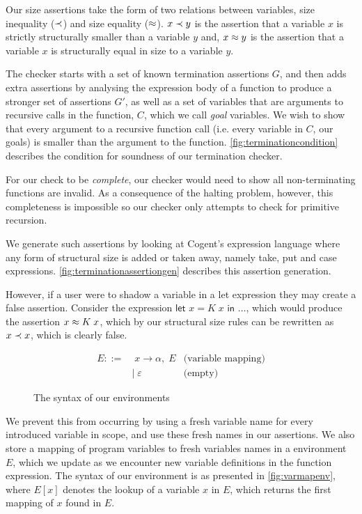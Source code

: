 Our size assertions take the form of two relations between variables, 
size inequality ($\prec$) and size equality ($\approx$).
$x \prec y$ is the assertion that a variable $x$ is strictly
structurally smaller than a variable $y$ and, $x \approx y$ is the assertion that a
variable $x$ is structurally equal in size to a variable $y$.

The checker starts with a set of known termination assertions $G$, and then adds
extra assertions by analysing the expression body of a function to produce
a stronger set of assertions $G'$, as well as a set of variables that are arguments
to recursive calls in the function, $C$, which we call \emph{goal} variables.
We wish to show that every argument to a recursive 
function call (i.e. every variable in $C$, our goals) is smaller than the argument to 
the function. \autoref{fig:terminationcondition} describes the condition 
for soundness of our termination checker. 

For our check to be \emph{complete},
our checker would need to show all non-terminating functions are invalid.
As a consequence of the halting problem, however, this completeness is impossible
so our checker only attempts to check for primitive recursion.

We generate such assertions by looking at Cogent's expression language 
where any form of structural size is added or taken away, namely
\textsf{take}, \textsf{put} and \textsf{case} expressions.
\autoref{fig:terminationassertiongen} describes this assertion generation.

However, if a user were to shadow a variable in a let expression they may
create a false assertion. Consider the expression 
$\textsf{let } x = K\; x \textsf{ in } \dots$, which would produce the
assertion $x \approx K\; x$, which by our structural size rules can be rewritten as
$x \prec x$, which is clearly false.

\begin{figure}
    \centering
    \begin{align*}
        E ::=&\; x \rightarrow \alpha,\; E  & \text{(variable mapping)} \\
             &|\; \varepsilon                 & \text{(empty)}
    \end{align*}
    \caption{The syntax of our environments}
    \label{fig:varmapenv}
\end{figure}

We prevent this from occurring by using a fresh variable name for every
introduced variable in scope, and use these fresh names in our assertions.
We also store a mapping of program variables to fresh variables names in a
environment $E$, which we update as we encounter new variable definitions in the
function expression. The syntax of our environment is as
presented in \autoref{fig:varmapenv}, where $E[x]$ denotes the lookup
of a variable $x$ in $E$, which returns the first mapping of $x$ found in $E$. 

